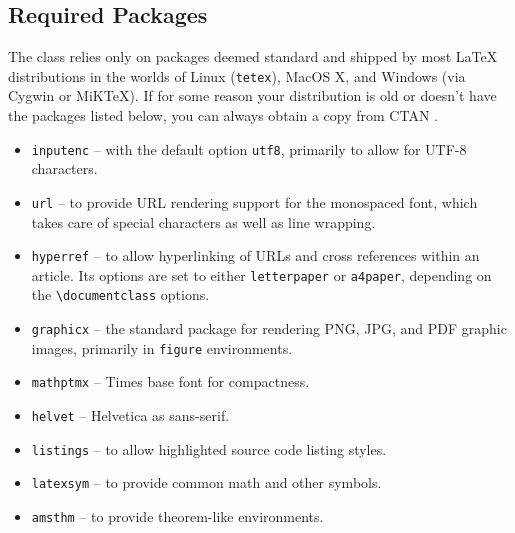 \documentclass{easychair}
\newcommand{\easychair}{\sf{easychair}}
\newcommand{\miktex}{MiK{\TeX}}
\begin{document}
\subsection{Required Packages}

The {\easychair} class relies only on packages deemed standard and shipped by
most {\LaTeX} distributions in the worlds of Linux (\texttt{tetex}), MacOS X,
and Windows (via Cygwin or {\miktex}).
If for some reason your distribution is old or doesn't have the packages
listed below, you can always obtain a copy from CTAN \cite{ctan}.

\begin{itemize}
\item
\texttt{inputenc} \cite{inputenc-package} -- with the default option
\texttt{utf8}, primarily to allow for UTF-8 characters.

\item
\texttt{url} \cite{url-package} -- to provide URL rendering support for the
monospaced font, which takes care of special characters as well as line 
wrapping.

\item
\texttt{hyperref} \cite{hyperref-package} -- to allow hyperlinking of URLs and
cross references within an article.
Its options are set to either \verb+letterpaper+ or \verb+a4paper+, depending
on the \verb+\documentclass+ options.

\item
\texttt{graphicx} \cite{graphicx-package} -- the standard package for rendering
PNG, JPG, and PDF graphic images, primarily in \texttt{figure} environments.

\item
\texttt{mathptmx} \cite{mathptmx-package} -- Times base font for compactness.

\item
\texttt{helvet} \cite{helvet-package} -- Helvetica as {\sf sans-serif}.

\item
\texttt{listings} \cite{listings-package} -- to allow highlighted source code 
listing styles.

\item
\texttt{latexsym} \cite{latexsym-package} -- to provide common math and other 
symbols.

\item
\texttt{amsthm} \cite{amsthm-package} -- to provide {\AmS} theorem-like 
environments.


\end{itemize}
\end{document}
